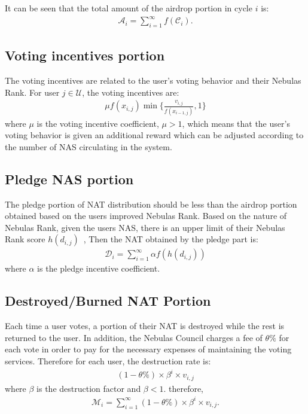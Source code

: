 It can be seen that the total amount of the airdrop portion in cycle $i$ is:
\begin{align}
\mathcal{A}_i = \sum_{i=1}^{\infty}f(\mathcal{C}_i).
\end{align}

\subsection{Voting incentives portion}
The voting incentives are related to the user's voting behavior and their Nebulas Rank. For user $j \in \mathcal{U}$, the voting incentives are:
\begin{align}
\mu f(x_{i,j}) \min\{\frac{v_{i,j}}{f(x_{i-1,j})},1\}
\end{align}
\noindent where $\mu$ is the voting incentive coefficient, $\mu > 1$, which means that the user's voting behavior is given an additional reward which can be adjusted according to the number of NAS circulating in the system.

\subsection{Pledge NAS portion}
The pledge portion of NAT distribution should be less than the airdrop portion obtained based on the users improved Nebulas Rank. Based on the nature of Nebulas Rank, given the users NAS, there is an upper limit of their Nebulas Rank  score $h(d_{i,j})$~\cite{ImproveNR},
Then the NAT obtained by the pledge part is:
\begin{align}
\mathcal{D}_i = \sum_{i=1}^{\infty}\alpha f(h(d_{i,j}))
\end{align}
\noindent where $\alpha$ is the pledge incentive coefficient.


\subsection{Destroyed/Burned NAT Portion}
\label{burn}
Each time a user votes, a portion of their NAT is destroyed while the rest is returned to the user. In addition, the Nebulas Council charges a fee of $\theta\%$ for each vote in order to pay for the necessary expenses of maintaining the voting services. Therefore for each user, the destruction rate is:
\begin{align}
(1-\theta\%) \times \beta^i \times v_{i,j}
\end{align}
\noindent where $\beta$ is the destruction factor and $\beta < 1$. therefore,
\begin{align}
    \mathcal{M}_i = \sum_{i=1}^{\infty} (1-\theta\%) \times \beta^i \times v_{i,j} .
\end{align}

